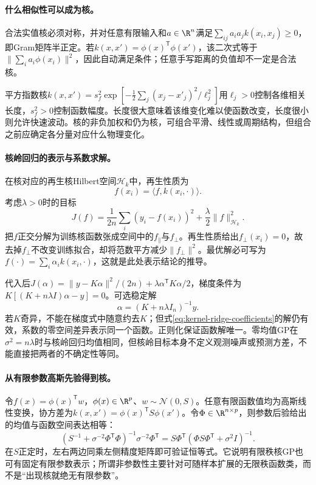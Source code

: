 \paragraph{什么相似性可以成为核。}
合法实值核必须对称，并对任意有限输入和$a\in\R^n$满足$\sum_{ij}a_ia_jk(x_i,x_j)\geq0$，即Gram矩阵半正定。若$k(x,x')=\phi(x)^{\mathsf T}\phi(x')$，该二次式等于$\|\sum_ia_i\phi(x_i)\|^2$，因此自动满足条件；任意手写距离的负值却不一定是合法核。

平方指数核$k(x,x')=s_f^2\exp[-\frac12\sum_j(x_j-x'_j)^2/\ell_j^2]$用$\ell_j>0$控制各维相关长度，$s_f^2>0$控制函数幅度。长度很大意味着该维变化难以使函数改变，长度很小则允许快速波动。核的非负加权和仍为核，可组合平滑、线性或周期结构，但组合之前应确定各分量对应什么物理变化。

\paragraph{核岭回归的表示与系数求解。}
在核对应的再生核Hilbert空间$\mathcal H_k$中，再生性质为
\begin{equation}
 f(x_i)=\langle f,k(x_i,\cdot)\rangle.
\end{equation}
考虑$\lambda>0$时的目标
\begin{equation}
 J(f)=\frac1{2n}\sum_i(y_i-f(x_i))^2+\frac\lambda2\|f\|_{\mathcal H_k}^2.
\end{equation}
把$f$正交分解为训练核函数张成空间中的$f_\parallel$与$f_\perp$。再生性质给出$f_\perp(x_i)=0$，故去掉$f_\perp$不改变训练拟合，却将范数平方减少$\|f_\perp\|^2$。最优解必可写为$f(\cdot)=\sum_i\alpha_i k(x_i,\cdot)$，这就是此处表示结论的推导。

代入后$J(\alpha)=\|y-K\alpha\|^2/(2n)+\lambda\alpha^{\mathsf T}K\alpha/2$，梯度条件为$K[(K+n\lambda I)\alpha-y]=0$。可选稳定解
\begin{equation}
 \alpha=(K+n\lambda I_n)^{-1}y.\label{eq:kernel-ridge-coefficients}
\end{equation}
若$K$奇异，不能在梯度式中随意约去$K$；但式\eqref{eq:kernel-ridge-coefficients}的解仍有效，系数的零空间差异表示同一个函数。正则化保证函数解唯一。零均值GP在$\sigma^2=n\lambda$时与核岭回归均值相同，但核岭目标本身不定义观测噪声或预测方差，不能直接把两者的不确定性等同。

\paragraph{从有限参数高斯先验得到核。}
令$f(x)=\phi(x)^{\mathsf T}w$，$\phi(x)\in\R^p$、$w\sim\mathcal N(0,S)$。任意有限函数值均为高斯线性变换，协方差为$k(x,x')=\phi(x)^{\mathsf T}S\phi(x')$。令$\Phi\in\R^{n\times p}$，则参数后验给出的均值与函数空间表达相等：
\begin{equation}
 (S^{-1}+\sigma^{-2}\Phi^{\mathsf T}\Phi)^{-1}\sigma^{-2}\Phi^{\mathsf T}
 =S\Phi^{\mathsf T}(\Phi S\Phi^{\mathsf T}+\sigma^2I)^{-1}.
\end{equation}
在$S$正定时，左右两边同乘左侧精度矩阵即可验证恒等式。它说明有限秩核GP也可有固定有限参数表示；所谓非参数性主要针对可随样本扩展的无限秩函数类，而不是“出现核就绝无有限参数”。

